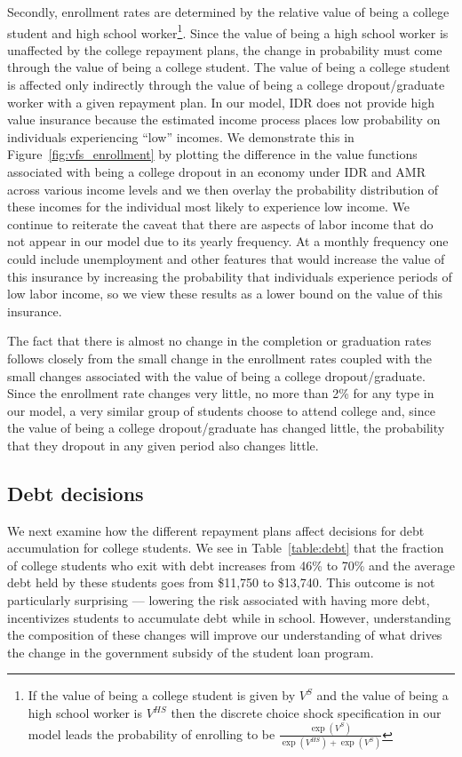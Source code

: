   Secondly, enrollment rates are determined by the relative value of being a college student and
  high school worker\footnote{If the value of being a college student is given by $V^S$ and the
  value of being a high school worker is $V^{HS}$ then the discrete choice shock specification in
  our model leads the probability of enrolling to be $\frac{\exp(V^S)}{\exp(V^{HS}) + \exp(V^S)}$}.
  Since the value of being a high school worker is unaffected by the college repayment plans, the
  change in probability must come through the value of being a college student. The value of being a
  college student is affected only indirectly through the value of being a college dropout/graduate
  worker with a given repayment plan. In our model, IDR does not provide high value insurance
  because the estimated income process places low probability on individuals experiencing ``low''
  incomes. We demonstrate this in Figure~\ref{fig:vfs_enrollment} by plotting the difference in the
  value functions associated with being a college dropout in an economy under IDR and AMR across
  various income levels and we then overlay the probability distribution of these incomes for the
  individual most likely to experience low income. We continue to reiterate the caveat that there
  are aspects of labor income that do not appear in our model due to its yearly frequency. At a
  monthly frequency one could include unemployment and other features that would increase the value
  of this insurance by increasing the probability that individuals experience periods of low labor
  income, so we view these results as a lower bound on the value of this insurance.

  The fact that there is almost no change in the completion or graduation rates follows closely from
  the small change in the enrollment rates coupled with the small changes associated with the value
  of being a college dropout/graduate. Since the enrollment rate changes very little, no more than
  2\% for any type in our model, a very similar group of students choose to attend college and,
  since the value of being a college dropout/graduate has changed little, the probability that they
  dropout in any given period also changes little.


\subsection{Debt decisions} \label{subsec:dd}

  We next examine how the different repayment plans affect decisions for debt accumulation for
  college students. We see in Table~\ref{table:debt} that the fraction of college students who exit
  with debt increases from 46\% to 70\% and the average debt held by these students goes from
  \$11,750 to \$13,740. This outcome is not particularly surprising --- lowering the risk associated
  with having more debt, incentivizes students to accumulate debt while in school. However,
  understanding the composition of these changes will improve our understanding of what drives the
  change in the government subsidy of the student loan program.

